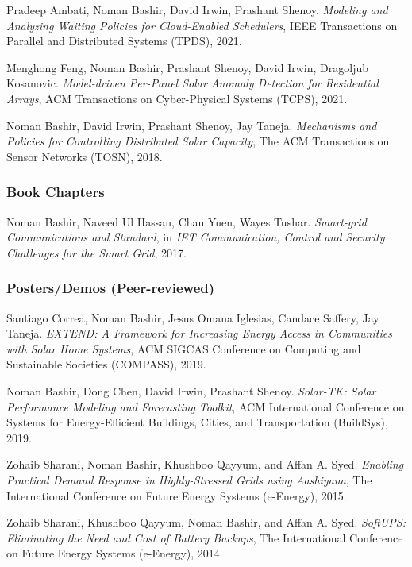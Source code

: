 \documentclass[11pt, a4paper, DIV=12]{scrartcl}
\begin{document}
\begin{thebibliography}{5}
Pradeep Ambati, Noman Bashir, David Irwin, Prashant Shenoy.
\emph{Modeling and Analyzing Waiting Policies for Cloud-Enabled Schedulers},
IEEE Transactions on Parallel and Distributed Systems (TPDS), 2021.

Menghong Feng, Noman Bashir, Prashant Shenoy, David Irwin, Dragoljub Kosanovic.
\emph{Model-driven Per-Panel Solar Anomaly Detection for Residential Arrays},
ACM Transactions on Cyber-Physical Systems (TCPS), 2021.

Noman Bashir, David Irwin, Prashant Shenoy, Jay Taneja.
\emph{Mechanisms and Policies for Controlling Distributed Solar Capacity},
The ACM Transactions on Sensor Networks (TOSN), 2018.

\subsubsection*{Book Chapters}

Noman Bashir, Naveed Ul Hassan, Chau Yuen, Wayes Tushar.
\emph{Smart-grid Communications and Standard},
in \emph{IET Communication, Control and Security Challenges for the Smart Grid}, 2017.


\subsubsection*{Posters/Demos (Peer-reviewed)}

Santiago Correa, Noman Bashir, Jesus Omana Iglesias, Candace Saffery, Jay Taneja.
\emph{EXTEND: A Framework for Increasing Energy Access in Communities with Solar Home Systems},
ACM SIGCAS Conference on Computing and Sustainable Societies (COMPASS), 2019.

Noman Bashir, Dong Chen, David Irwin, Prashant Shenoy.
\emph{Solar-TK: Solar Performance Modeling and Forecasting Toolkit},
ACM International Conference on Systems for Energy-Efficient Buildings, Cities, and Transportation (BuildSys), 2019.

Zohaib Sharani, Noman Bashir, Khushboo Qayyum, and Affan A. Syed.
\emph{Enabling Practical Demand Response in Highly-Stressed Grids using Aashiyana},
The International Conference on Future Energy Systems (e-Energy), 2015.

Zohaib Sharani, Khushboo Qayyum, Noman Bashir, and Affan A. Syed.
\emph{SoftUPS: Eliminating the Need and Cost of Battery Backups},
The International Conference on Future Energy Systems (e-Energy), 2014.


\end{thebibliography}
\end{document}
